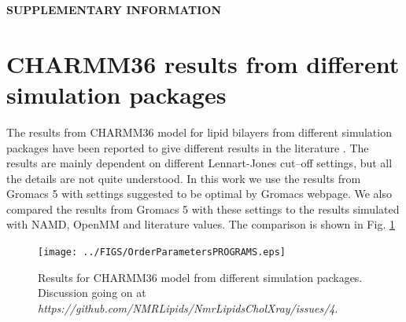 \documentclass[aps,prl,superscriptaddress,twocolumn]{revtex4}
\begin{document}
\begin{acknowledgments}
\end{acknowledgments}
\newpage
\appendix
\begin{center}
{\bf SUPPLEMENTARY INFORMATION}
\end{center}
\section{CHARMM36 results from different simulation packages}
The results from CHARMM36 model for lipid bilayers from different 
simulation packages have been reported to give different results in
the literature \cite{piggot12,lee16}. The results are mainly
dependent on different Lennart-Jones cut--off settings, but
all the details are not quite understood. In this work we use
the results from Gromacs 5 with settings suggested to be optimal
by Gromacs webpage. We also compared the results from Gromacs 5 with
these settings to the results simulated with NAMD, OpenMM and literature
values. The comparison is shown in Fig. \ref{programsCOMP}
 \begin{figure}[]
  \centering
  \texttt{[image: ../FIGS/OrderParametersPROGRAMS.eps]}

  \caption{\label{programsCOMP}
    Results for CHARMM36 model \cite{klauda10} from different simulation packages.
    Discussion going on at {\it https://github.com/NMRLipids/NmrLipidsCholXray/issues/4}.
  }
\end{figure}




\listoftodos
\end{document}

